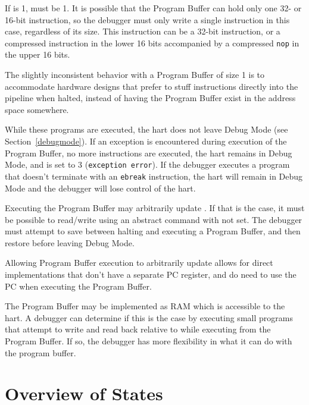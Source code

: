 If \Fprogbufsize is 1, \Fimpebreak must be 1. It is possible that the Program
Buffer can hold only one 32- or 16-bit instruction, so the debugger must only
write a single instruction in this case, regardless of its size.
This instruction can be a 32-bit
instruction, or a compressed instruction in the lower 16 bits accompanied by a
compressed {\tt nop} in the upper 16 bits.

\begin{commentary}
    The slightly inconsistent behavior with a Program Buffer of size 1 is to
    accommodate hardware designs that prefer to stuff instructions directly
    into the pipeline when halted, instead of having the Program Buffer exist
    in the address space somewhere.
\end{commentary}

While these programs are executed, the hart does not leave Debug Mode (see
Section~\ref{debugmode}).  If an exception is encountered during execution of
the Program Buffer, no more instructions are executed, the hart remains in Debug
Mode, and \Fcmderr is set to 3 ({\tt exception error}).  If the debugger
executes a program that doesn't terminate with an {\tt ebreak} instruction, the
hart will remain in Debug Mode and the debugger will lose control of the hart.

Executing the Program Buffer may arbitrarily update \Rdpc. If that is the case, it must be
possible to read/write \Rdpc using an abstract command with \Fpostexec not set.
The debugger must attempt to save \Rdpc between halting and
executing a Program Buffer, and then restore \Rdpc before leaving Debug Mode.

\begin{commentary}
    Allowing Program Buffer execution to arbitrarily update \Rdpc allows for direct
    implementations that don't have a separate PC register, and do need to use
    the PC when executing the Program Buffer.
\end{commentary}

The Program Buffer may be implemented as RAM which is accessible to the
hart. A debugger can determine if this is the case by executing small
programs that attempt to write and read back relative to \Rpc while executing
from the Program Buffer.
If so, the debugger has more flexibility in what it can do with the program buffer.

\section{Overview of States}

